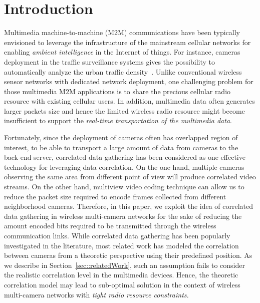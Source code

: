 \section{Introduction}
\label{sec::introduction}
Multimedia machine-to-machine (M2M) communications have been typically envisioned to leverage the infrastructure of the mainstream cellular networks for enabling {\em ambient intelligence} in the Internet of things.
For instance, cameras deployment in the traffic surveillance systems gives the possibility to automatically analyze the urban traffic density~\cite{Kapsch,Traficon,Citilog}.
%
Unlike conventional wireless sensor networks with dedicated network deployment, one challenging problem for those multimedia M2M applications is to share the precious cellular radio resource with existing cellular users.
%
In addition, multimedia data often generates larger packets size and hence the limited wireless radio resource might become insufficient to support the {\em real-time transportation of the multimedia data}.

Fortunately, since the deployment of cameras often has overlapped region of interest, to be able to transport a large amount of data from cameras to the back-end server, correlated data gathering has been considered as one effective technology for leveraging data correlation.
On the one hand, multiple cameras observing the same area from different point of view will produce correlated video streams. 
On the other hand, multiview video coding technique can allow us to reduce the packet size required to encode frames collected from different neighborhood cameras.
Therefore, in this paper, we exploit the idea of correlated data gathering in wireless multi-camera networks for the sake of reducing the amount encoded bits required to be transmitted through the wireless communication links.
%
While correlated data gathering has been popularly investigated in the literature, most related work has modeled the correlation between cameras from a theoretic perspective using their predefined position.
As we describe in Section~\ref{sec::relatedWork}, such an assumption fails to consider the realistic correlation level in the multimedia devices.
Hence, the theoretic correlation model may lead to sub-optimal solution in the context of wireless multi-camera networks with {\em tight radio resource constraints.}

